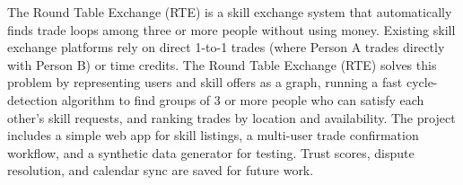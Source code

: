 The Round Table Exchange (RTE) is a skill exchange system that automatically finds trade loops among three or more people without using money. Existing skill exchange platforms rely on direct 1-to-1 trades (where Person A trades directly with Person B) or time credits. The Round Table Exchange (RTE) solves this problem by representing users and skill offers as a graph, running a fast cycle-detection algorithm to find groups of 3 or more people who can satisfy each other's skill requests, and ranking trades by location and availability. The project includes a simple web app for skill listings, a multi-user trade confirmation workflow, and a synthetic data generator for testing. Trust scores, dispute resolution, and calendar sync are saved for future work.